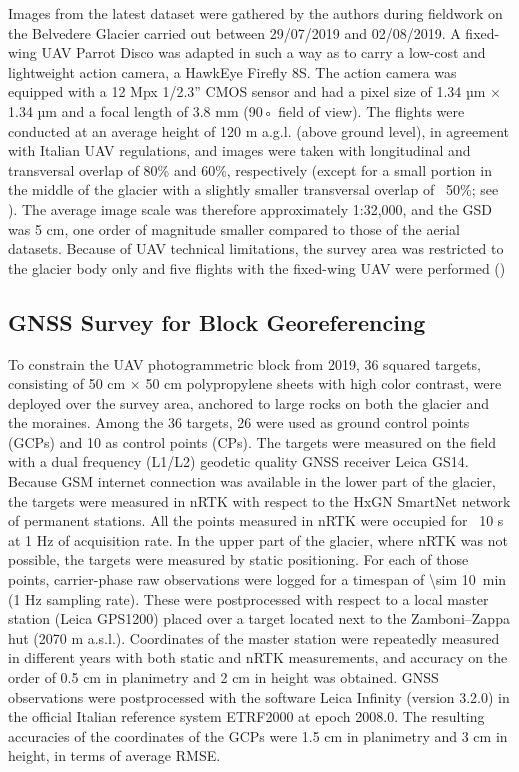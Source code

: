 Images from the latest dataset were gathered by the authors during fieldwork on the
Belvedere Glacier carried out between 29/07/2019 and 02/08/2019. A fixed-wing UAV
Parrot Disco was adapted in such a way as to carry a low-cost and lightweight action
camera, a HawkEye Firefly 8S. The action camera was equipped with a 12 Mpx 1/2.3” CMOS
sensor and had a pixel size of 1.34 µm × 1.34 µm and a focal length of 3.8 mm (90◦ field
of view). The flights were conducted at an average height of 120 m a.g.l. (above ground
level), in agreement with Italian UAV regulations, and images were taken with longitudinal
and transversal overlap of 80\% and 60\%, respectively (except for a small portion in the
middle of the glacier with a slightly smaller transversal overlap of ~50\%; see ).
The average image scale was therefore approximately 1:32,000, and the GSD was 5 cm,
one order of magnitude smaller compared to those of the aerial datasets. Because of UAV
technical limitations, the survey area was restricted to the glacier body only and five flights
with the fixed-wing UAV were performed ()


\subsection{GNSS Survey for Block Georeferencing}

To constrain the UAV photogrammetric block from 2019, 36 squared targets, consisting
of 50 cm × 50 cm polypropylene sheets with high color contrast, were deployed over the
survey area, anchored to large rocks on both the glacier and the moraines. Among the
36 targets, 26 were used as ground control points (GCPs) and 10 as control points (CPs).
The targets were measured on the field with a dual frequency (L1/L2) geodetic quality
GNSS receiver Leica GS14. Because GSM internet connection was available in the lower
part of the glacier, the targets were measured in nRTK with respect to the HxGN SmartNet
network of permanent stations. All the points measured in nRTK were occupied for ~10 s
at 1 Hz of acquisition rate. In the upper part of the glacier, where nRTK was not possible,
the targets were measured by static positioning. For each of those points, carrier-phase
raw observations were logged for a timespan of \SI{\sim 10}{\minute} (1 Hz sampling rate).
These were postprocessed with respect to a local master station (Leica GPS1200) placed 
over a target located next to the Zamboni–Zappa hut (2070 m a.s.l.). 
Coordinates of the master station were repeatedly measured in different years with both
static and nRTK measurements, and accuracy on the order of 0.5 cm in planimetry and 2 cm 
in height was obtained. 
GNSS observations were postprocessed with the software Leica Infinity (version 3.2.0) in the
official Italian reference system ETRF2000 at epoch 2008.0. The resulting accuracies of
the coordinates of the GCPs were 1.5 cm in planimetry and 3 cm in height, in terms of
average RMSE.

